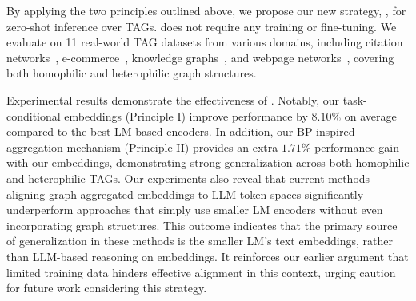 By applying the two principles outlined above, we propose our new strategy, \proj, for zero-shot inference over TAGs. \proj does not require any training or fine-tuning. We evaluate \proj on 11 real-world TAG datasets from various domains, including citation networks~\cite{mccallum2000automating, giles1998citeseer, sen2008collective}, e-commerce~\cite{ni2019justifying}, knowledge graphs~\cite{mernyei2020wiki}, and webpage networks~\cite{craven1998learning}, covering both homophilic and heterophilic graph structures. 

Experimental results demonstrate the effectiveness of \proj. Notably, our task-conditional embeddings (Principle I) improve performance by $8.10\%$ on average compared to the best LM-based encoders. In addition, our BP-inspired aggregation mechanism (Principle II) provides an extra $1.71\%$ performance gain with our embeddings, demonstrating strong generalization across both homophilic and heterophilic TAGs.  Our experiments also reveal that current methods aligning graph-aggregated embeddings to LLM token spaces significantly underperform approaches that simply use smaller LM encoders without even incorporating graph structures. This outcome indicates that the primary source of generalization in these methods is the smaller LM’s text embeddings, rather than LLM-based reasoning on embeddings. It reinforces our earlier argument that limited training data hinders effective alignment in this context, urging caution for future work considering this strategy. %



